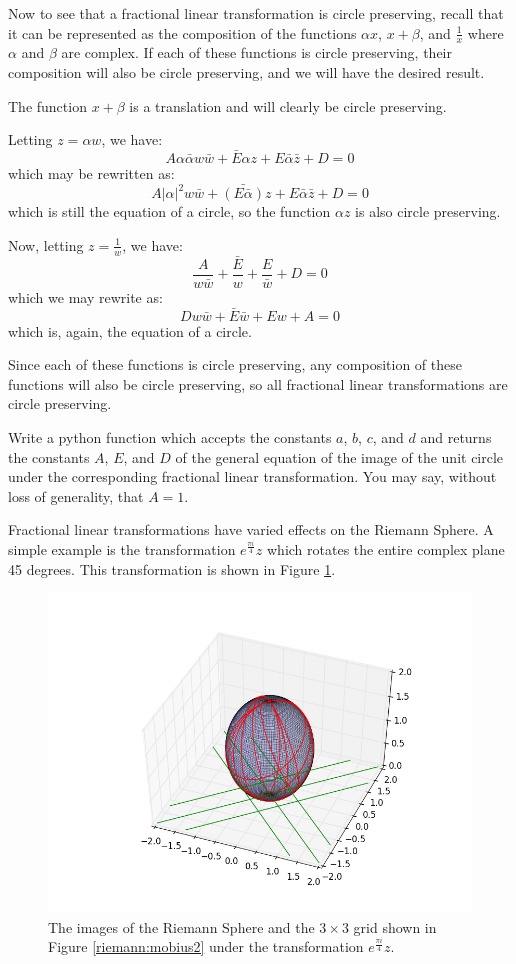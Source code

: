 Now to see that a fractional linear transformation is circle preserving, recall that it can be represented as the composition of the functions $\alpha x$, $x+\beta$, and $\frac{1}{x}$ where $\alpha$ and $\beta$ are complex.
If each of these functions is circle preserving, their composition will also be circle preserving, and we will have the desired result. 

The function $x+\beta$ is a translation and will clearly be circle preserving.

Letting $z=\alpha w$, we have: 
$$A\alpha \bar{\alpha} w\bar{w}+\bar{E}\alpha z+E\bar{\alpha} \bar{z}+D=0$$
which may be rewritten as:
$$A|\alpha|^2 w\bar{w}+\bar{(E\bar{\alpha})}z+E\bar{\alpha} \bar{z}+D=0$$
which is still the equation of a circle, so the function $\alpha z$ is also circle preserving.

Now, letting $z=\frac{1}{w}$, we have:
$$\frac{A}{w\bar{w}}+\frac{\bar{E}}{w}+\frac{E}{\bar{w}}+D=0$$
which we may rewrite as:
$$Dw\bar{w}+\bar{E}\bar{w}+Ew+A=0$$
which is, again, the equation of a circle.

Since each of these functions is circle preserving, any composition of these functions will also be circle preserving, so all fractional linear transformations are circle preserving.

\begin{problem}
Write a python function which accepts the constants $a$, $b$, $c$, and $d$ and returns the constants $A$, $E$, and $D$ of the general equation of the image of the unit circle under the corresponding fractional linear transformation.
You may say, without loss of generality, that $A=1$.
\end{problem}

Fractional linear transformations have varied effects on the Riemann Sphere.
A simple example is the transformation $e^{\frac{\pi i}{4}}z$ which rotates the entire complex plane 45 degrees.
This transformation is shown in Figure \ref{riemann:mobius4}.

\begin{figure}
\includegraphics[width=\textwidth]{mobius4.png}
\caption{The images of the Riemann Sphere and the $3\times 3$ grid shown in Figure \ref{riemann:mobius2} under the transformation $e^{\frac{\pi i}{4}}z$.}
\label{riemann:mobius4}
\end{figure}

